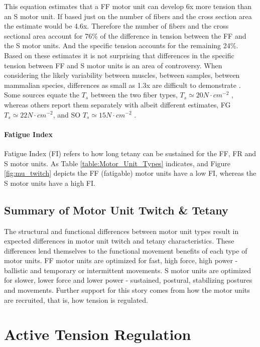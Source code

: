 This equation estimates that a FF motor unit can develop 6x more tension than an S motor unit. If based just on the number of fibers and the cross section area the estimate would be 4.6x. Therefore the number of fibers and the cross sectional area account for 76\% of the difference in tension between the FF and the S motor units. And the specific tension accounts for the remaining 24\%. Based on these estimates it is not surprising that differences in the specific tension between FF and S motor units is an area of controversy. When considering the likely variability between muscles, between samples, between mammalian species, differences as small as 1.3x are difficult to demonstrate \cite{lieber_skeletal_2010}. Some sources equate the $T_s$ between the two fiber types, $T_s \simeq 20 N \cdot cm^{-2}$ \cite{feher_quantitative_2017}, whereas others report them separately with albeit different estimates, FG $T_s \simeq 22 N \cdot cm^{-2}$, and SO $T_s \simeq 15 N \cdot cm^{-2}$ \cite{lieber_skeletal_2010}.

\paragraph{Fatigue Index}
Fatigue Index (FI) refers to how long tetany can be sustained for the FF, FR and S motor units. As Table \ref{table:Motor_Unit_Types} indicates, and Figure \ref{fig:mu_twitch} depicts the FF (fatigable) motor units have a low FI, whereas the S motor units have a high FI.

\subsection{Summary of Motor Unit Twitch \& Tetany}
The structural and functional differences between motor unit types result in expected differences in motor unit twitch and tetany characteristics. These differences lend themselves to the functional movement benefits of each type of motor units. FF motor units are optimized for fast, high force, high power - ballistic and temporary or intermittent movements. S motor units are optimized for slower, lower force and lower power - sustained, postural, stabilizing postures and movements. Further support for this story comes from how the motor units are recruited, that is, how tension is regulated.

\section{Active Tension Regulation}


